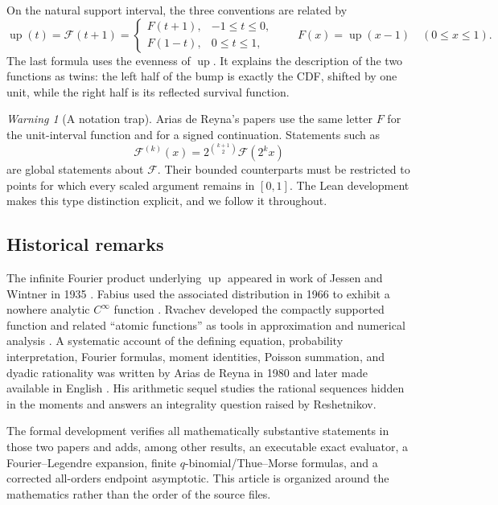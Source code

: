 \documentclass[11pt]{article}
\numberwithin{equation}{section}
\theoremstyle{definition}
\theoremstyle{remark}
\newtheorem{warning}[theorem]{Warning}
\newcommand{\GF}{\mathcal F}
\newcommand{\upf}{\operatorname{up}}
\begin{document}
On the natural support interval, the three conventions are related by
\begin{equation}\label{eq:F-up-relations}
 \upf(t)=\GF(t+1)=
 \begin{cases}
   F(t+1),&-1\le t\le0,\\
   F(1-t),&0\le t\le1,
 \end{cases}
 \qquad
 F(x)=\upf(x-1)\quad(0\le x\le1).
\end{equation}
The last formula uses the evenness of $\upf$.  It explains the description of the two functions as twins: the left half of the bump is exactly the CDF, shifted by one unit, while the right half is its reflected survival function.

\begin{warning}[A notation trap]
Arias de Reyna's papers use the same letter $F$ for the unit-interval function and for a signed continuation.  Statements such as
\[
 \GF^{(k)}(x)=2^{\binom{k+1}{2}}\GF(2^kx)
\]
are global statements about $\GF$.  Their bounded counterparts must be restricted to points for which every scaled argument remains in $[0,1]$.  The Lean development makes this type distinction explicit, and we follow it throughout.
\end{warning}

\subsection{Historical remarks}

The infinite Fourier product underlying $\upf$ appeared in work of Jessen and Wintner in 1935 \cite{JessenWintner}.  Fabius used the associated distribution in 1966 to exhibit a nowhere analytic $C^\infty$ function \cite{Fabius1966}.  Rvachev developed the compactly supported function and related ``atomic functions'' as tools in approximation and numerical analysis \cite{Rvachev1990}.  A systematic account of the defining equation, probability interpretation, Fourier formulas, moment identities, Poisson summation, and dyadic rationality was written by Arias de Reyna in 1980 and later made available in English \cite{Arias05442}.  His arithmetic sequel \cite{Arias06487} studies the rational sequences hidden in the moments and answers an integrality question raised by Reshetnikov.

The formal development \cite{ProveIt} verifies all mathematically substantive statements in those two papers and adds, among other results, an executable exact evaluator, a Fourier--Legendre expansion, finite $q$-binomial/Thue--Morse formulas, and a corrected all-orders endpoint asymptotic.  This article is organized around the mathematics rather than the order of the source files.
\end{document}
